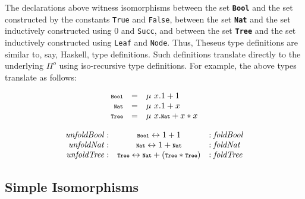 \documentclass{article}
\newcommand{\kw}[1]{{\scriptsize{\textbf{\texttt{#1}}}}}
\newcommand{\ctr}[1]{{\scriptsize{\texttt{#1}}}}
\begin{document}
\noindent The declarations above witness isomorphisms between the set
\kw{Bool} and the set constructed by the constants \ctr{True} and
\ctr{False}, between the set \kw{Nat} and the set inductively constructed
using {\scriptsize{0}} and \ctr{Succ}, and between the set \kw{Tree} and the
set inductively constructed using \ctr{Leaf} and \ctr{Node}.  Thus, Theseus
type definitions are similar to, say, Haskell, type definitions. Such
definitions translate directly to the underlying \ensuremath{\Pi^{o}} using iso-recursive
type definitions. For example, the above types translate as follows:
\vspace{-20pt}
\begin{small}
\begin{multicols}{3}
\[\begin{array}{rclr}
\kw{Bool}   & = &  \mu  ~x.1 + 1 \\
\kw{Nat}   & = &  \mu  ~x. 1 + x \\
\kw{Tree}   & = &  \mu  ~x. \kw{Nat}  + x * x \\
 \end{array}\]

\[\begin{array}{rclr}
\mathit{unfoldBool} :& \kw{Bool}  \leftrightarrow 1 + 1 &: \mathit{foldBool} \\
\mathit{unfoldNat} :& \kw{Nat}  \leftrightarrow 1 + \kw{Nat}  &: \mathit{foldNat} \\
\mathit{unfoldTree} :& \kw{Tree}  \leftrightarrow \kw{Nat}  + (\kw{Tree}  * \kw{Tree} ) &: \mathit{foldTree} \\
 \end{array}\]
\end{multicols}
\end{small}

\subsection{Simple Isomorphisms}
\end{document}
